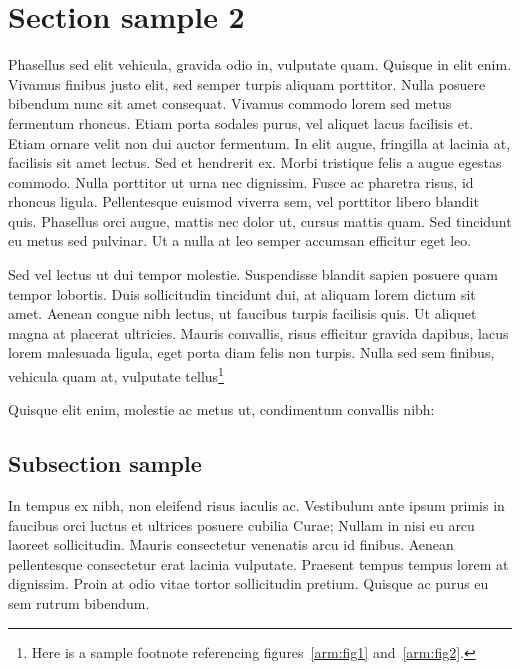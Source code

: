 \section{Section sample 2}\label{ch1:sec}

Phasellus sed elit vehicula, gravida odio in, vulputate quam. Quisque in elit enim. Vivamus finibus justo elit, sed semper turpis aliquam porttitor. Nulla posuere bibendum nunc sit amet consequat. Vivamus commodo lorem sed metus fermentum rhoncus. Etiam porta sodales purus, vel aliquet lacus facilisis et. Etiam ornare velit non dui auctor fermentum. In elit augue, fringilla at lacinia at, facilisis sit amet lectus. Sed et hendrerit ex. Morbi tristique felis a augue egestas commodo. Nulla porttitor ut urna nec dignissim. Fusce ac pharetra risus, id rhoncus ligula. Pellentesque euismod viverra sem, vel porttitor libero blandit quis. Phasellus orci augue, mattis nec dolor ut, cursus mattis quam. Sed tincidunt eu metus sed pulvinar. Ut a nulla at leo semper accumsan efficitur eget leo.

Sed vel lectus ut dui tempor molestie. Suspendisse blandit sapien posuere quam tempor lobortis. Duis sollicitudin tincidunt dui, at aliquam lorem dictum sit amet. Aenean congue nibh lectus, ut faucibus turpis facilisis quis. Ut aliquet magna at placerat ultricies. Mauris convallis, risus efficitur gravida dapibus, lacus lorem malesuada ligula, eget porta diam felis non turpis. Nulla sed sem finibus, vehicula quam at, vulputate tellus\footnote{Here is a sample footnote referencing figures~\ref{arm:fig1}
and~\ref{arm:fig2}.}  

Quisque elit enim, molestie ac metus ut, condimentum convallis nibh:

\subsection{Subsection sample}

In tempus ex nibh, non eleifend risus iaculis ac. Vestibulum ante ipsum primis in faucibus orci luctus et ultrices posuere cubilia Curae; Nullam in nisi eu arcu laoreet sollicitudin. Mauris consectetur venenatis arcu id finibus. Aenean pellentesque consectetur erat lacinia vulputate. Praesent tempus tempus lorem at dignissim. Proin at odio vitae tortor sollicitudin pretium. Quisque ac purus eu sem rutrum bibendum.

%


